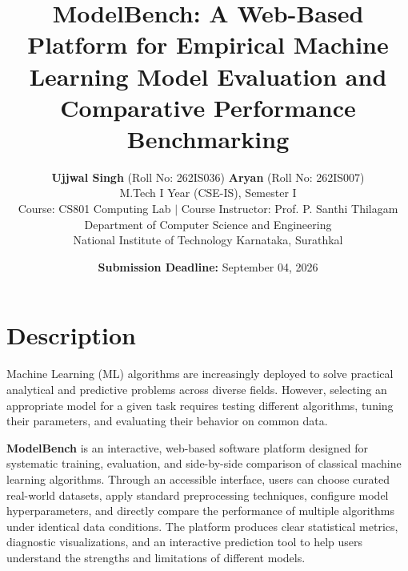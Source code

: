 \documentclass[11pt,a4paper]{article}
\begin{document}
\title{\textbf{\Large ModelBench: A Web-Based Platform for Empirical Machine Learning Model Evaluation and Comparative Performance Benchmarking}}

\author{
    \textbf{Ujjwal Singh} (Roll No: 262IS036) \qquad \textbf{Aryan} (Roll No: 262IS007) \\[0.4em]
    \normalsize M.Tech I Year (CSE-IS), Semester I \\[0.2em]
    \normalsize Course: CS801 Computing Lab $\mid$ Course Instructor: Prof. P. Santhi Thilagam \\[0.2em]
    \normalsize Department of Computer Science and Engineering \\
    \normalsize National Institute of Technology Karnataka, Surathkal
}
\date{\textbf{Submission Deadline:} September 04, 2026}

\maketitle
\thispagestyle{empty}

\vspace{-1.2em}

\section{Description}
\label{sec:description}
Machine Learning (ML) algorithms are increasingly deployed to solve practical analytical and predictive problems across diverse fields. However, selecting an appropriate model for a given task requires testing different algorithms, tuning their parameters, and evaluating their behavior on common data.

\textbf{ModelBench} is an interactive, web-based software platform designed for systematic training, evaluation, and side-by-side comparison of classical machine learning algorithms. Through an accessible interface, users can choose curated real-world datasets, apply standard preprocessing techniques, configure model hyperparameters, and directly compare the performance of multiple algorithms under identical data conditions. The platform produces clear statistical metrics, diagnostic visualizations, and an interactive prediction tool to help users understand the strengths and limitations of different models.
\end{document}
